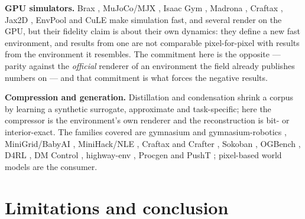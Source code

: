 \documentclass{article}
\begin{document}
\textbf{GPU simulators.} Brax \citep{brax}, MuJoCo/MJX \citep{mujoco}, Isaac
Gym \citep{isaacgym}, Madrona \citep{madrona}, Craftax \citep{craftax}, Jax2D
\citep{kinetix}, EnvPool \citep{envpool} and CuLE \citep{cule} make simulation
fast, and several render on the GPU, but their fidelity claim is about their
own dynamics: they define a new fast environment, and results from one are not
comparable pixel-for-pixel with results from the environment it resembles. The
commitment here is the opposite --- parity against the \emph{official} renderer
of an environment the field already publishes numbers on --- and that
commitment is what forces the negative results.

\textbf{Compression and generation.} Distillation and condensation
\citep{distill,condense} shrink a corpus by learning a synthetic surrogate,
approximate and task-specific; here the compressor is the environment's own
renderer and the reconstruction is bit- or interior-exact. The families covered
are gymnasium and gymnasium-robotics \citep{gymnasium,gymrobotics},
MiniGrid/BabyAI \citep{minigrid,babyai}, MiniHack/NLE \citep{minihack,nle},
Craftax and Crafter \citep{craftax,crafter}, Sokoban \citep{sokoban}, OGBench
\citep{ogbench}, D4RL \citep{d4rl}, DM Control \citep{dmcontrol}, highway-env
\citep{highwayenv}, Procgen \citep{procgen} and PushT \citep{ibc,dp};
pixel-based world models \citep{worldmodels,dreamer,dinowm} are the consumer.

\section{Limitations and conclusion}
\end{document}
